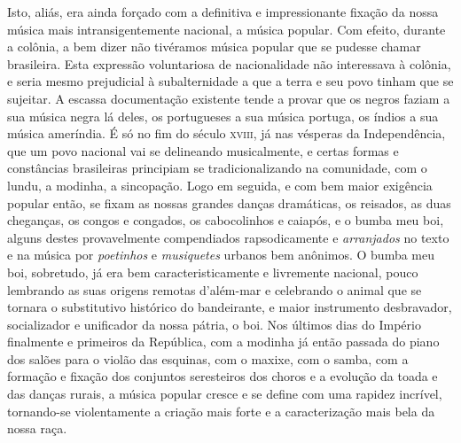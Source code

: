Isto, aliás, era ainda forçado com a definitiva e impressionante fixação
da nossa música mais intransigentemente nacional, a música popular. Com
efeito, durante a colônia, a bem dizer não tivéramos música popular que
se pudesse chamar brasileira. Esta expressão voluntariosa de
nacionalidade não interessava à colônia, e seria mesmo prejudicial à
subalternidade a que a terra e seu povo tinham que se sujeitar. A
escassa documentação existente tende a provar que os negros faziam a sua
música negra lá deles, os portugueses a sua música portuga, os índios a
sua música ameríndia. É só no fim do século \textsc{xviii}, já nas vésperas da
Independência, que um povo nacional vai se delineando musicalmente, e
certas formas e constâncias brasileiras principiam se tradicionalizando
na comunidade, com o lundu, a modinha, a sincopação. Logo em seguida, e
com bem maior exigência popular então, se fixam as nossas grandes danças
dramáticas, os reisados, as duas cheganças, os congos e congados, os
cabocolinhos e caiapós, e o bumba meu boi, alguns destes provavelmente
compendiados rapsodicamente e \textit{arranjados} no texto e na música por
\textit{poetinhos} e \textit{musiquetes} urbanos bem anônimos. O bumba meu boi, sobretudo,
já era bem caracteristicamente e livremente nacional, pouco lembrando as
suas origens remotas d'além-mar e celebrando o animal que se tornara o
substitutivo histórico do bandeirante, e maior instrumento desbravador,
socializador e unificador da nossa pátria, o boi. Nos últimos dias do
Império finalmente e primeiros da República, com a modinha já então
passada do piano dos salões para o violão das esquinas, com o maxixe,
com o samba, com a formação e fixação dos conjuntos seresteiros dos
choros e a evolução da toada e das danças rurais, a música popular
cresce e se define com uma rapidez incrível, tornando-se violentamente a
criação mais forte e a caracterização mais bela da nossa raça.

